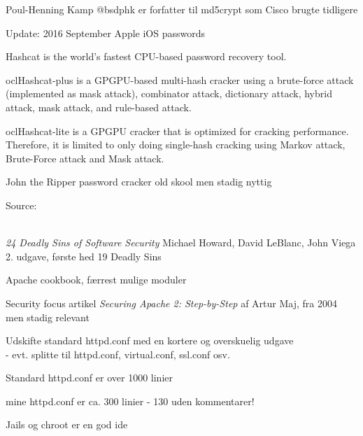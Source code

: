 \documentclass[20pt,landscape,a4paper,footrule]{foils}
\begin{document}


Poul-Henning Kamp @bsdphk er forfatter til md5crypt som Cisco brugte tidligere\\

Update: 2016 September Apple iOS passwords

\begin{list2}
\item Hashcat is the world's fastest CPU-based password recovery tool.
\item oclHashcat-plus is a GPGPU-based multi-hash cracker using a brute-force attack (implemented as mask attack), combinator attack, dictionary attack, hybrid attack, mask attack, and rule-based attack.
\item oclHashcat-lite is a GPGPU cracker that is optimized for cracking performance. Therefore, it is limited to only doing single-hash cracking using Markov attack, Brute-Force attack and Mask attack.
\item John the Ripper password cracker old skool men stadig nyttig
\end{list2}

Source:\\
\\





\begin{list1}
\item \emph{24 Deadly Sins of Software Security}
Michael Howard, David LeBlanc, John Viega 2. udgave, første hed 19 Deadly Sins
\end{list1}



\begin{list2}
\item Apache cookbook, færrest mulige moduler
\item Security focus artikel
\emph{Securing Apache 2: Step-by-Step}
af Artur Maj, fra 2004 men stadig relevant

\item Udskifte standard httpd.conf med en
  kortere og overskuelig udgave\\ - evt. splitte til httpd.conf,
  virtual.conf, ssl.conf osv.
\item Standard httpd.conf er over 1000 linier
\item mine httpd.conf er ca. 300 linier - 130 uden kommentarer!
\item Jails og chroot er en god ide
\end{list2}
\end{document}
